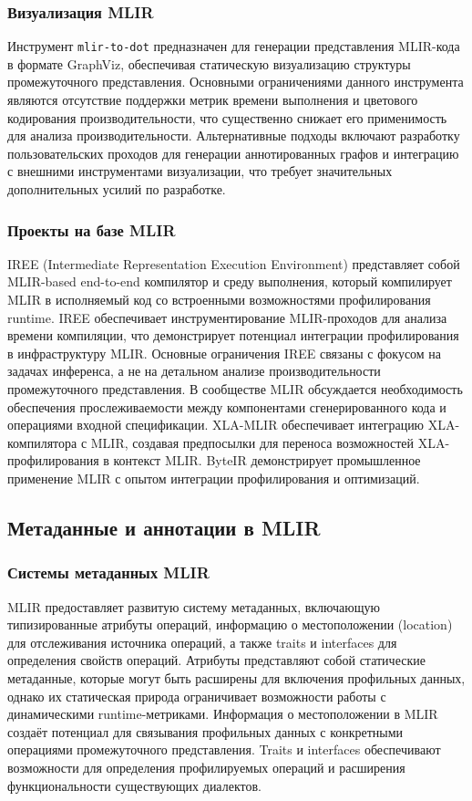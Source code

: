 \subsubsection{Визуализация MLIR}
Инструмент \texttt{mlir-to-dot} предназначен для генерации представления MLIR-кода в формате GraphViz, обеспечивая статическую визуализацию структуры промежуточного представления. Основными ограничениями данного инструмента являются отсутствие поддержки метрик времени выполнения и цветового кодирования производительности, что существенно снижает его применимость для анализа производительности.
Альтернативные подходы включают разработку пользовательских проходов для генерации аннотированных графов и интеграцию с внешними инструментами визуализации, что требует значительных дополнительных усилий по разработке.

\subsubsection{Проекты на базе MLIR}
IREE (Intermediate Representation Execution Environment) представляет собой MLIR-based end-to-end компилятор и среду выполнения, который компилирует MLIR в исполняемый код со встроенными возможностями профилирования runtime. IREE обеспечивает инструментирование MLIR-проходов для анализа времени компиляции, что демонстрирует потенциал интеграции профилирования в инфраструктуру MLIR.
Основные ограничения IREE связаны с фокусом на задачах инференса, а не на детальном анализе производительности промежуточного представления. В сообществе MLIR обсуждается необходимость обеспечения прослеживаемости между компонентами сгенерированного кода и операциями входной спецификации.
XLA-MLIR обеспечивает интеграцию XLA-компилятора с MLIR, создавая предпосылки для переноса возможностей XLA-профилирования в контекст MLIR. ByteIR демонстрирует промышленное применение MLIR с опытом интеграции профилирования и оптимизаций.

\subsection{Метаданные и аннотации в MLIR}

\subsubsection{Системы метаданных MLIR}
MLIR предоставляет развитую систему метаданных, включающую типизированные атрибуты операций, информацию о местоположении (location) для отслеживания источника операций, а также traits и interfaces для определения свойств операций. Атрибуты представляют собой статические метаданные, которые могут быть расширены для включения профильных данных, однако их статическая природа ограничивает возможности работы с динамическими runtime-метриками.
Информация о местоположении в MLIR создаёт потенциал для связывания профильных данных с конкретными операциями промежуточного представления. Traits и interfaces обеспечивают возможности для определения профилируемых операций и расширения функциональности существующих диалектов.
